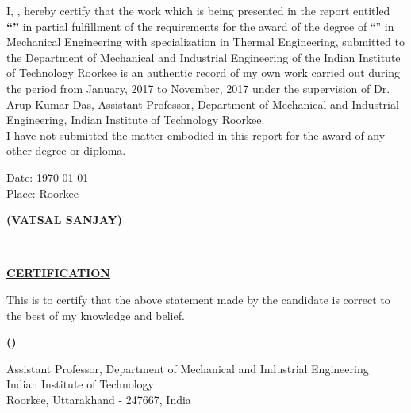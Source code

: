 \begin{declaration}
\addchaptertocentry{\authorshipname}
\noindent I, \authorname, hereby certify that the work which is being presented in the report entitled {\bf\enquote{\ttitle}} in partial fulfillment of the requirements for the award of the degree of \enquote{\degreename} in Mechanical Engineering with specialization in Thermal Engineering, submitted to the Department of Mechanical and Industrial Engineering of the Indian Institute of Technology Roorkee is an  authentic record of my own work carried out during the period from January, 2017 to November, 2017 under the supervision of Dr. Arup Kumar Das, Assistant Professor, Department of Mechanical and Industrial Engineering, Indian Institute of Technology Roorkee.\\
I have not submitted the matter embodied in this report for the award of any other degree or diploma.\\
\begin{minipage}{0.5\linewidth}\vspace{2.5cm}
\begin{flushleft}
Date: \today\\
Place: Roorkee
\end{flushleft}
\end{minipage}
\begin{minipage}{0.5\linewidth}\vspace{2.5cm}
\begin{flushright}
\textbf{(VATSAL SANJAY)}
\end{flushright} 
\end{minipage}\vspace{10mm}
\HRule\\
\begin{center}
{\Large\bfseries\underline{CERTIFICATION}\par}
\end{center}
This is to certify that the above statement made by the candidate is correct to the best of my knowledge and belief.\\
\begin{minipage}{0.56\linewidth}\vspace{2.5cm}
\hfill
\end{minipage}
\begin{minipage}{0.4\linewidth}\vspace{2.5cm}
\begin{center}
\textbf{(\supname)}\\
{Assistant Professor, Department of Mechanical and Industrial Engineering\\Indian Institute of Technology\\ Roorkee,
Uttarakhand - 247667, India\par}
\end{center}
\end{minipage}
\end{declaration}